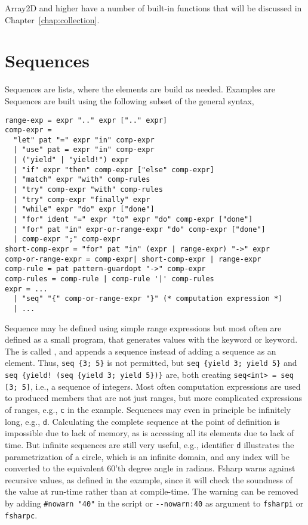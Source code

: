 Array2D and higher have a number of built-in functions that will be discussed in Chapter~\ref{chap:collection}.

\section{Sequences}
\label{sec:sequences}
Sequences are lists, where the elements are build as needed. Examples are
%
%
Sequences are built using the following subset of the general syntax,
\begin{lstlisting}[language=ebnf]
range-exp = expr ".." expr [".." expr]
comp-expr =
  "let" pat "=" expr "in" comp-expr
  | "use" pat = expr "in" comp-expr
  | ("yield" | "yield!") expr
  | "if" expr "then" comp-expr ["else" comp-expr]
  | "match" expr "with" comp-rules
  | "try" comp-expr "with" comp-rules
  | "try" comp-expr "finally" expr
  | "while" expr "do" expr ["done"]
  | "for" ident "=" expr "to" expr "do" comp-expr ["done"]
  | "for" pat "in" expr-or-range-expr "do" comp-expr ["done"]
  | comp-expr ";" comp-expr
short-comp-expr = "for" pat "in" (expr | range-expr) "->" expr
comp-or-range-expr = comp-expr| short-comp-expr | range-expr
comp-rule = pat pattern-guardopt "->" comp-expr
comp-rules = comp-rule | comp-rule '|' comp-rules
expr = ... 
  | "seq" "{" comp-or-range-expr "}" (* computation expression *)
  | ...
\end{lstlisting}
%
Sequence may be defined using simple range expressions but most often are defined as a small program, that generates values with the  keyword or  keyword. The  is called , and appends a sequence instead of adding a sequence as an element. Thus, \lstinline!seq {3; 5}! is not permitted, but \lstinline!seq {yield 3; yield 5}! and \lstinline|seq {yield! (seq {yield 3; yield 5})}| are, both creating \lstinline!seq<int> = seq [3; 5]!, i.e., a sequence of integers. Most often computation expressions are used to produced members that are not just ranges, but more complicated expressions of ranges, e.g., \lstinline!c! in the example. Sequences may even in principle be infinitely long, e.g., \lstinline!d!. Calculating the complete sequence at the point of definition is impossible due to lack of memory, as is accessing all its elements due to lack of time. But infinite sequences are still very useful, e.g., identifier \lstinline!d! illustrates the parametrization of a circle, which is an infinite domain, and any index will be converted to the equivalent 60'th degree angle in radians. Fsharp warns against recursive values, as defined in the example, since it will check the soundness of the value at run-time rather than at compile-time. The warning can be removed by adding \lstinline!#nowarn "40"! in the script or \lstinline!--nowarn:40! as argument to \lstinline[language=console]!fsharpi! or \lstinline[language=console]!fsharpc!.

